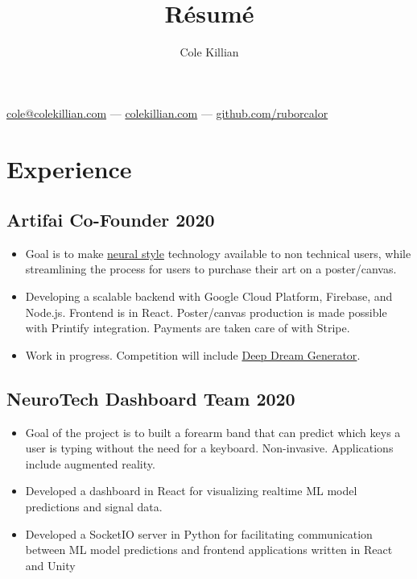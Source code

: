 \documentclass{article}
\makeatletter
\renewcommand{\maketitle}{
\begin{center}
{\color{green}\huge\bfseries
\theauthor}

\vspace{.25em}
\href{mailto:cole@colekillian.com}{cole@colekillian.com} --- \href{https://colekillian.com}{colekillian.com} --- \href{https://github.com/ruborcalor}{github.com/ruborcalor} 
\end{center}
}
\makeatother
\begin{document}
\title{R\'esum\'e}
\author{Cole Killian}

\maketitle
\thispagestyle{empty} 

\section{Experience}


\subsection{Artifai Co-Founder \hfill 2020}
\begin{itemize}[leftmargin=0.5in]
  \setlength\itemsep{0.00em}
\item Goal is to make \href{https://arxiv.org/abs/1508.06576}{neural style} technology available to non technical users, while streamlining the process for users to purchase their art on a poster/canvas.
\item Developing a scalable backend with Google Cloud Platform, Firebase, and Node.js. Frontend is in React. Poster/canvas production is made possible with Printify integration. Payments are taken care of with Stripe.
\item Work in progress. Competition will include \href{https://deepdreamgenerator.com}{Deep Dream Generator}.
\end{itemize}



\subsection{NeuroTech Dashboard Team \hfill 2020}
\begin{itemize}[leftmargin=0.5in]
  \setlength\itemsep{0.00em}
\item Goal of the project is to built a forearm band that can predict which keys a
  user is typing without the need for a keyboard. Non-invasive. Applications
  include augmented reality.
\item Developed a dashboard in React for visualizing realtime
  ML model predictions and signal data.
\item Developed a SocketIO server in Python for facilitating communication
  between ML model predictions and frontend applications written in React and Unity
\end{itemize}
\end{document}
